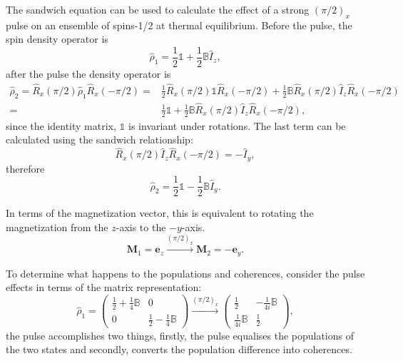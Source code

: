The sandwich equation can be used to calculate the effect of a strong $(\pi/2)_x$ pulse
on an ensemble of spins-1/2 at thermal equilibrium.
Before the pulse, the spin density operator is
\begin{equation}
  \hat{\rho}_1 = \frac{1}{2}\mathbb{1} + \frac{1}{2}\mathbb{B}\hat{I}_z,
\end{equation}
after the pulse the density operator is
\begin{align}
  \hat{\rho}_2 = \hat{R}_x(\pi/2)\hat{\rho}_1\hat{R}_x(-\pi/2) =& \frac{1}{2}\hat{R}_x(\pi/2)\mathbb{1}\hat{R}_x(-\pi/2) + \frac{1}{2}\mathbb{B}\hat{R}_x(\pi/2)\hat{I}_z\hat{R}_x(-\pi/2) \\
  =& \frac{1}{2}\mathbb{1} + \frac{1}{2}\mathbb{B}\hat{R}_x(\pi/2)\hat{I}_z\hat{R}_x(-\pi/2),
\end{align}
since the identity matrix, $\mathbb{1}$ is invariant under rotations. The last term
can be calculated using the sandwich relationship:
\begin{equation}
  \hat{R}_x(\pi/2)\hat{I}_z\hat{R}_x(-\pi/2) = -\hat{I}_y,
\end{equation}
therefore
\begin{equation}
  \hat{\rho}_2 = \frac{1}{2}\mathbb{1} - \frac{1}{2}\mathbb{B}\hat{I}_y.
\end{equation}

In terms of the magnetization vector, this is equivalent to rotating
the magnetization from the $z$-axis to the $-y$-axis.
\begin{equation}
  \mathbf{M}_1 = \mathbf{e}_z \xrightarrow{(\pi/2)_x} \mathbf{M}_2 = -\mathbf{e}_y.
\end{equation}

To determine what happens to the populations and coherences, consider the
pulse effects in terms of the matrix representation:
\begin{equation}
  \hat{\rho}_1 = \begin{pmatrix}
    \frac{1}{2} + \frac{1}{4}\mathbb{B} & 0\\
    0 & \frac{1}{2} - \frac{1}{4}\mathbb{B}
\end{pmatrix}\xrightarrow{(\pi/2)_x}\begin{pmatrix}
  \frac{1}{2} & -\frac{1}{4i}\mathbb{B}\\
  \frac{1}{4i}\mathbb{B} & \frac{1}{2}
\end{pmatrix},
\end{equation}
the pulse accomplishes two things, firstly, the pulse equalises the populations of the
two states and secondly, converts the population difference into coherences.

